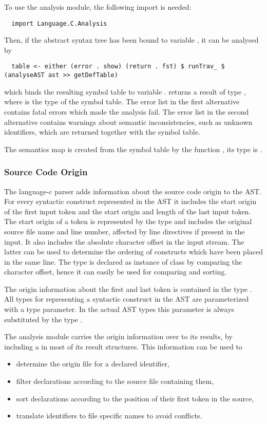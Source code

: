 To use the analysis module, the following import is needed:
\begin{verbatim}
  import Language.C.Analysis
\end{verbatim}

Then, if the abstract syntax tree has been bound to variable , it can be analysed by
\begin{verbatim}
  table <- either (error . show) (return . fst) $ runTrav_ $ (analyseAST ast >> getDefTable)
\end{verbatim}
which binds the resulting symbol table to variable . 
returns a result of type , where 
is the type of the symbol table. The error list in the first alternative contains fatal errors which made the analysis fail. 
The error list in the second alternative contains warnings about semantic inconsistencies, such as unknown identifiers,
which are returned together with the symbol table.

The semantics map is created from the symbol table by the function , its type is .

\subsubsection{Source Code Origin}

The language-c parser adds information about the source code origin to the AST. For every syntactic construct represented
in the AST it includes the start origin of the first input token and the start origin and length of the last input token.
The start origin of a token is represented by the type  and includes the original source file name and 
line number, affected by line directives if present in the input. It also includes the absolute character offset in the 
input stream. The latter can be used to determine the ordering of constructs which have been placed in the same line.
The type  is declared as instance of class  by comparing the character offset, hence it can 
easily be used for comparing and sorting.

The origin information about the first and last token is contained in the type . All types for representing
a syntactic construct in the AST are parameterized with a type parameter. In the actual AST types this parameter is always 
substituted by the type . 

The analysis module carries the origin information over to its results, by including a  in most of its
result structures. This information can be used to
\begin{itemize}
\item determine the origin file for a declared identifier,
\item filter declarations according to the source file containing them,
\item sort declarations according to the position of their first token in the source,
\item translate identifiers to file specific names to avoid conflicts.
\end{itemize}

